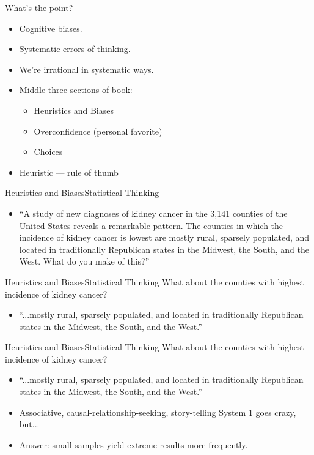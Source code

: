 \documentclass{beamer}
\begin{document}
\begin{frame}{What's the point?}{}
\begin{itemize}
\addtolength{\itemsep}{0.5\baselineskip}
\item Cognitive biases.
\item Systematic errors of thinking.
\item We're irrational in systematic ways.
\item Middle three sections of book:
    \begin{itemize}
    \addtolength{\itemsep}{0.5\baselineskip}
    \item Heuristics and Biases
    \item Overconfidence (personal favorite)
    \item Choices
    \end{itemize}
\item Heuristic --- rule of thumb
\end{itemize}
\end{frame}

\begin{frame}{Heuristics and Biases}{Statistical Thinking}
\begin{itemize}
\item ``A study of new diagnoses of kidney cancer in the 3,141 counties of the United States reveals a remarkable pattern. The counties in which the incidence of kidney cancer is lowest are mostly rural, sparsely populated, and located in traditionally Republican states in the Midwest, the South, and the West. What do you make of this?''
\end{itemize}
\end{frame}


\begin{frame}{Heuristics and Biases}{Statistical Thinking}
What about the counties with highest incidence of kidney cancer?
\begin{itemize}
\item ``...mostly rural, sparsely populated, and located in traditionally Republican states in the Midwest, the South, and the West.''
\end{itemize}
\end{frame}

\begin{frame}{Heuristics and Biases}{Statistical Thinking}
What about the counties with highest incidence of kidney cancer?
\begin{itemize}
\addtolength{\itemsep}{0.5\baselineskip}
\item ``...mostly rural, sparsely populated, and located in traditionally Republican states in the Midwest, the South, and the West.''
\item Associative, causal-relationship-seeking, story-telling System 1 goes crazy, but...
\item Answer: small samples yield extreme results more frequently.
\end{itemize}
\end{frame}
\end{document}
